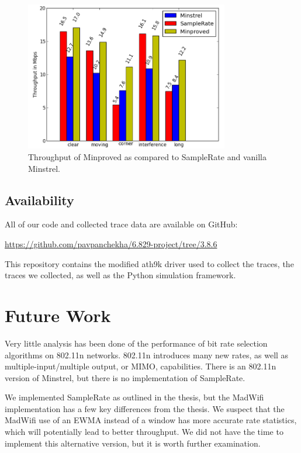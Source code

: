 \documentclass[letterpaper,twocolumn,10pt]{article}
\begin{document}
\begin{figure}[htb]
  \hspace{-2em}\includegraphics[width=3.5in]{mnVSspVSmp1.png}\vspace{-0em}
  \caption{Throughput of Minproved as compared to SampleRate and vanilla Minstrel.}
\label{figure:4}
\end{figure}


\subsection{Availability}
All of our code and collected trace data are available on GitHub:

\noindent
{\small\url{https://github.com/pavpanchekha/6.829-project/tree/3.8.6}}

This repository contains the modified ath9k driver used to collect the traces, the traces we collected, as well as the Python simulation framework. 

\section{Future Work}

Very little analysis has been done of the performance of bit rate selection algorithms on 802.11n networks. 802.11n introduces many new rates, as well as multiple-input/multiple output, or MIMO, capabilities. There is an 802.11n version of Minstrel, but there is no implementation of SampleRate. 

We implemented SampleRate as outlined in the thesis, but the MadWifi implementation has a few key differences from the thesis. We suspect that the MadWifi use of an EWMA instead of a window has more accurate rate statistics, which will potentially lead to better throughput. We did not have the time to implement this alternative version, but it is worth further examination.
\end{document}
